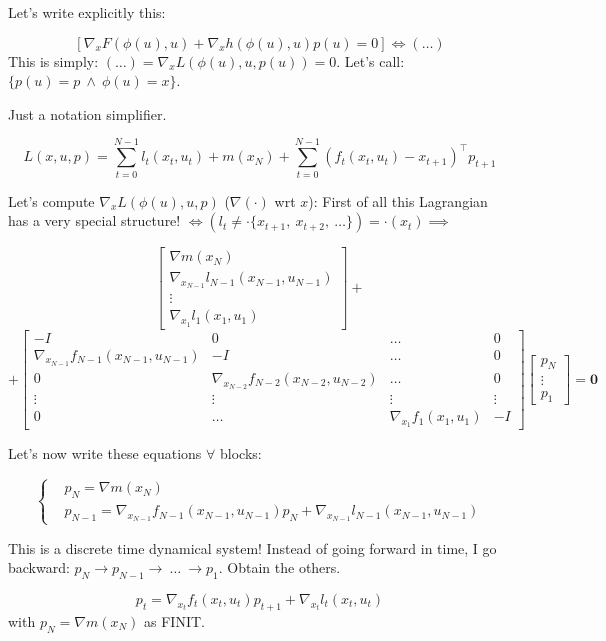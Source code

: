 Let's write explicitly this:

\[
	[\nabla_x{F(\phi(u),u)} + \nabla_x{h(\phi(u),u)}p(u) = 0] \iff (\dots)
\]
This is simply: $(\dots) = \nabla_x{L(\phi(u),u,p(u))} = 0$. Let's call: $\{p(u)=p\ \land\ \phi(u)=x\}$.

Just a notation simplifier.

\[
	L(x,u,p) = \sum_{t=0}^{N-1}{l_t(x_t,u_t)} + m(x_N) + \sum_{t=0}^{N-1}{(f_t(x_t,u_t) - x_{t+1})^\top p_{t+1}}
\]

Let's compute $\nabla_x{L(\phi(u),u,p)}$ ($\nabla{(\mathord{\cdot})}$ wrt $x$):
First of all this Lagrangian has a very special structure! $\iff (l_t \neq \mathord{\cdot}\{x_{t+1},\ x_{t+2},\ \dots\}) = \mathord{\cdot}(x_t) \implies$

\[
	\begin{bmatrix}\nabla{m(x_N)}\\ \nabla_{x_{N-1}}{l_{N-1}(x_{N-1},u_{N-1})}\\ \vdots\\ \nabla_{x_1}{l_1(x_1,u_1)}\end{bmatrix} +
\]
\[
	+ \begin{bmatrix}-I&0&\dots&0\\ \nabla_{x_{N-1}}{f_{N-1}(x_{N-1},u_{N-1})}&-I&\dots&0\\0&\nabla_{x_{N-2}}{f_{N-2}(x_{N-2},u_{N-2})}&\dots&0\\ \vdots&\vdots&\vdots&\vdots\\ 0&\dots&\nabla_{x_1}{f_1(x_1,u_1)}&-I\end{bmatrix}\begin{bmatrix}p_N\\ \vdots\\p_1\end{bmatrix} = \mathbf{0}
\]

Let's now write these equations $\forall$ blocks:

\[
	\left\{
	\begin{aligned}
	&p_N = \nabla{m(x_N)}\\
	&p_{N-1} = \nabla_{x_{N-1}}{f_{N-1}(x_{N-1},u_{N-1})}p_N + \nabla_{x_{N-1}}{l_{N-1}(x_{N-1},u_{N-1})}
	\end{aligned}
	\right.
\]

This is a discrete time dynamical system! Instead of going forward in time, I go backward: $p_N \rightarrow p_{N-1} \rightarrow\ \dots\ \rightarrow p_1$. Obtain the others.

\[
	p_t = \nabla_{x_t}{f_t(x_t,u_t)}p_{t+1} + \nabla_{x_t}{l_t(x_t,u_t)}
\]
with $p_N = \nabla{m(x_N)}$ as FINIT.

